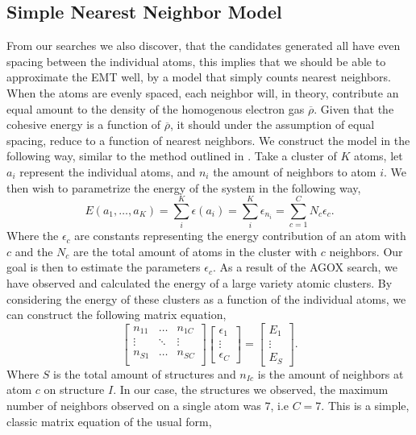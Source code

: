 \documentclass[working, oneside]{../../../Preambles/marginclass}
\begin{document}
\subsection*{Simple Nearest Neighbor Model} 
From our searches we also discover, that the candidates generated all have even spacing between the individual atoms, this implies that we should be able to approximate the EMT well, by a model that simply counts nearest neighbors. When the atoms are evenly spaced, each neighbor will, in theory, contribute an equal amount to the density of the homogenous electron gas $\overline{\rho }$. Given that the cohesive energy is a function of $\overline{\rho }$, it should under the assumption of equal spacing, reduce to a function of nearest neighbors.
We construct the model in the following way, similar to the method outlined in \cite{cluster2018}. Take a cluster of $K$ atoms, let $a_i$ represent the individual atoms, and $n_i$ the amount of neighbors to atom $i$. We then wish to parametrize the energy of the system in the following way, 
\[
E\left( a_1, \ldots, a_K \right) = \sum_i^{K}\epsilon\left( a_i \right) = \sum_i^{K}\epsilon_{n_i} = \sum_{c=1}^{C} N_c \epsilon_c
.\] 
Where the $\epsilon_c$ are constants representing the energy contribution of an atom with $c$ and the $N_c$ are the total amount of atoms in the cluster with $c$ neighbors. Our goal is then to estimate the parameters $\epsilon_c$. As a result of the AGOX search, we have observed and calculated the energy of a large variety atomic clusters. By considering the energy of these clusters as a function of the individual atoms, we can construct the following matrix equation, 
\[
\begin{bmatrix}
    n_{11} & \ldots & n_{1C} \\
    \vdots & \ddots & \vdots\\
     n_{S1} & \ldots  & n_{SC} \\
\end{bmatrix}
\begin{bmatrix} \epsilon_1\\ \vdots\\ \epsilon_C \end{bmatrix}
= \begin{bmatrix} E_1\\ \vdots\\ E_S \end{bmatrix}
.\] 
Where $S$ is the total amount of structures and $n_{Ic}$ is the amount of neighbors at atom $c$ on structure $I$. In our case, the structures we observed, the maximum number of neighbors observed on a single atom was $7$, i.e $C = 7$. This is a simple, classic matrix equation of the usual form,
\end{document}
